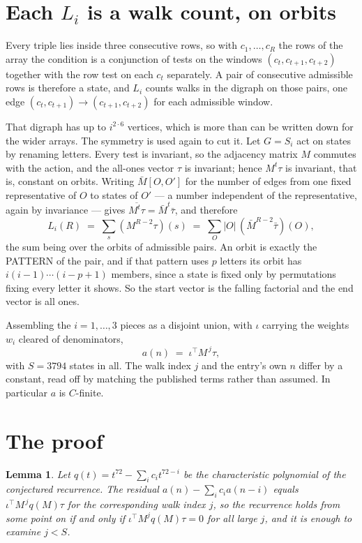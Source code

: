 \documentclass[11pt,a4paper]{article}
\theoremstyle{plain}
\newtheorem{lemma}[theorem]{Lemma}
\theoremstyle{definition}
\begin{document}
\section{Each $L_i$ is a walk count, on orbits}

Every triple lies inside three consecutive rows, so with $c_1,\dots,c_R$ the rows of the array
the condition is a conjunction of tests on the windows $(c_{t},c_{t+1},c_{t+2})$ together
with the row test on each $c_t$ separately. A pair of consecutive admissible rows is therefore
a state, and $L_i$ counts walks in the digraph on those pairs, one edge $(c_t,c_{t+1})\to
(c_{t+1},c_{t+2})$ for each admissible window.

That digraph has up to $i^{2\cdot6}$ vertices, which is more than can be written down for
the wider arrays. The symmetry is used again to cut it. Let $G=S_i$ act on states by renaming
letters. Every test is invariant, so the adjacency matrix $M$ commutes with the action, and the
all-ones vector $\tau$ is invariant; hence $M^{t}\tau$ is invariant, that is, constant on
orbits. Writing $\bar M[O,O']$ for the number of edges from one fixed representative of $O$ to
states of $O'$ --- a number independent of the representative, again by invariance --- gives
$\overline{M^{t}\tau}=\bar M^{t}\bar\tau$, and therefore
\[
L_i(R)\;=\;\sum_{s}(M^{R-2}\tau)(s)\;=\;\sum_{O}|O|\,(\bar M^{R-2}\bar\tau)(O),
\]
the sum being over the orbits of admissible pairs. An orbit is exactly the PATTERN of the pair,
and if that pattern uses $p$ letters its orbit has $i(i-1)\cdots(i-p+1)$ members, since a state
is fixed only by permutations fixing every letter it shows. So the start vector is the falling
factorial and the end vector is all ones.

Assembling the $i=1,\dots,3$ pieces as a disjoint union, with $\iota$ carrying the weights
$w_i$ cleared of denominators,
\[
a(n)\;=\;\iota^{\!\top}M^{\,j}\tau ,
\]
with $S=3794$ states in all. The walk index $j$ and the entry's own $n$ differ by a constant,
read off by matching the published terms rather than assumed. In particular $a$ is $C$-finite.

\section{The proof}

\begin{lemma}\label{lem:crit}
Let $q(t)=t^{72}-\sum_i c_it^{72-i}$ be the characteristic polynomial of the
conjectured recurrence. The residual $a(n)-\sum_ic_ia(n-i)$ equals
$\iota^{\!\top}M^{\,j}q(M)\tau$ for the corresponding walk index $j$, so the recurrence
holds from some point on if and only if $\iota^{\!\top}M^{j}q(M)\tau=0$ for all large $j$,
and it is enough to examine $j<S$.
\end{lemma}
\end{document}
